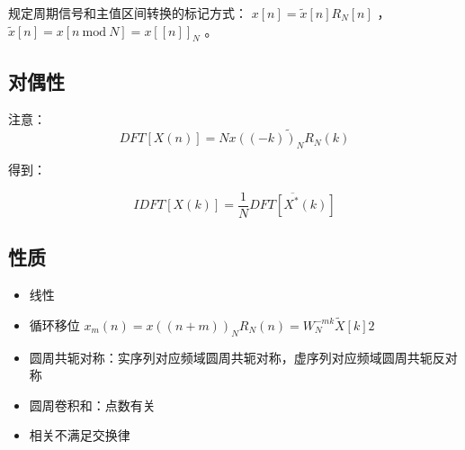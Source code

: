 \documentclass[cn,11pt,chinese,black,simple]{../elegantbook}
\begin{document}
规定周期信号和主值区间转换的标记方式： \(x[n] = \tilde{x}[n] R_N[n]\) ， \(\tilde{x}[n] = x [n \:\mathrm{ mod }\: N] =x[[n]]_N\) 。

\subsection{对偶性}


注意：\[DFT[X(n)] = N \tilde{x((-k))_N R_N(k)}\]

得到：

$$
I D F T [X(k)]=\frac{1}{N} \overline{D F T\left[X^{*}(k)\right]}
$$


\subsection{性质}

\begin{itemize}
    \item 线性
    \item 循环移位 $x_{m}(n)=x((n+m))_{N} R_{N}(n) = W_N^{-mk} \tilde{X}[k]2$
    \item 圆周共轭对称：实序列对应频域圆周共轭对称，虚序列对应频域圆周共轭反对称
    \item 圆周卷积和：点数有关
    \item 相关不满足交换律
\end{itemize}


\let\chapname\undefined
\ifx\mainclass\undefined
\end{document}
